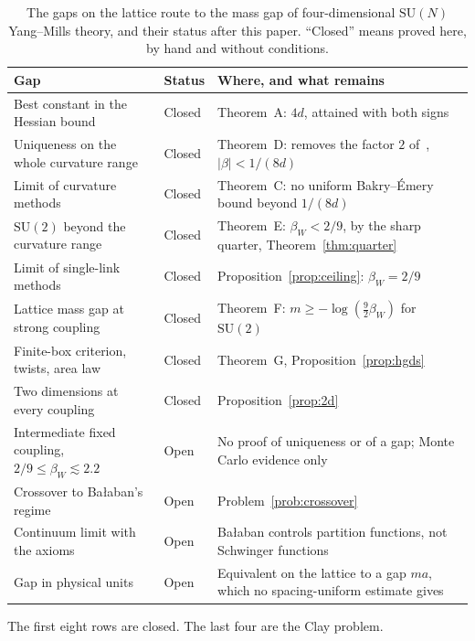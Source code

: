 \documentclass[aps,prd,twocolumn,superscriptaddress,nofootinbib,longbibliography,floatfix,amsmath,amssymb,10pt]{revtex4-2}
\makeatletter
\newcommand*{\raggedcells}{%
  \let\YM@arrayparboxrestore\@arrayparboxrestore
  \def\@arrayparboxrestore{\YM@arrayparboxrestore\rightskip\z@\@plus1fil\relax}}
\theoremstyle{definition}
\theoremstyle{remark}
\newcommand{\SU}{\mathrm{SU}}
\makeatother
\begin{document}
\begin{table}[t]
\raggedcells
\caption{The gaps on the lattice route to the mass gap of four-dimensional
$\SU(N)$ Yang--Mills theory, and their status after this paper. ``Closed''
means proved here, by hand and without conditions.}
\label{tab:gaps}
\begin{ruledtabular}
\begin{tabular}{p{}p{}p{}}
Gap & Status & Where, and what remains\\
\hline
Best constant in the Hessian bound & Closed & Theorem~A: $4d$, attained
with both signs\\
Uniqueness on the whole curvature range & Closed & Theorem~D: removes the
factor $2$ of~\cite{SZZ23}, $|\beta|<1/(8d)$\\
Limit of curvature methods & Closed & Theorem~C: no uniform Bakry--\'Emery
bound beyond $1/(8d)$\\
$\SU(2)$ beyond the curvature range & Closed & Theorem~E: $\beta_W<2/9$,
by the sharp quarter, Theorem~\ref{thm:quarter}\\
Limit of single-link methods & Closed & Proposition~\ref{prop:ceiling}:
$\beta_W=2/9$\\
Lattice mass gap at strong coupling & Closed & Theorem~F: $m\ge-\log(
\frac92\beta_W)$ for $\SU(2)$\\
Finite-box criterion, twists, area law & Closed & Theorem~G,
Proposition~\ref{prop:hgds}\\
Two dimensions at every coupling & Closed & Proposition~\ref{prop:2d}\\
Intermediate fixed coupling, $2/9\le\beta_W\lesssim2.2$ & Open & No proof of
uniqueness or of a gap; Monte Carlo evidence only~\cite{Cre80,MP99,LT01,
LTW04}\\
Crossover to Ba{\l}aban's regime & Open & Problem~\ref{prob:crossover}\\
Continuum limit with the axioms & Open & Ba{\l}aban controls partition
functions, not Schwinger functions~\cite{Bal89b}\\
Gap in physical units & Open & Equivalent on the lattice to a gap $ma$,
which no spacing-uniform estimate gives~\cite{BB26}\\
\end{tabular}
\end{ruledtabular}
\end{table}

The first eight rows are closed. The last four are the Clay problem.
\end{document}
